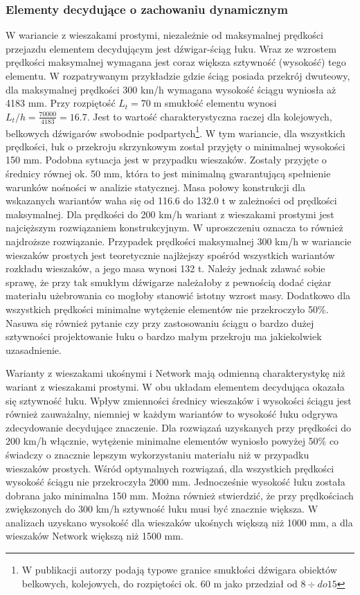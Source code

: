 \subsubsection{Elementy decydujące o zachowaniu dynamicznym}
W wariancie z wieszakami prostymi, niezależnie od maksymalnej prędkości przejazdu elementem decydującym jest dźwigar-ściąg łuku. Wraz ze wzrostem prędkości maksymalnej wymagana jest coraz większa sztywność (wysokość) tego elementu. W rozpatrywanym przykładzie gdzie ściąg posiada przekrój dwuteowy, dla maksymalnej prędkości 300 km/h wymagana wysokość ściągu wyniosła aż 4183 mm. Przy rozpiętość $L_t=70\;\mathrm{m}$ smukłość elementu wynosi $L_t/h=\frac{70 000}{4183}=16.7$. Jest to wartość charakterystyczna raczej dla kolejowych, belkowych dźwigarów swobodnie podpartych\footnote{
		W publikacji \cite{Madaj2009} autorzy podają typowe granice smukłości dźwigara obiektów belkowych, kolejowych, do rozpiętości ok. 60 m jako przedział od $8 \div do 15$}. 
W tym wariancie, dla wszystkich prędkości, łuk o przekroju skrzynkowym został przyjęty o minimalnej wysokości 150 mm. Podobna sytuacja jest w przypadku wieszaków. Zostały przyjęte o średnicy równej ok. 50 mm, która to jest minimalną gwarantującą spełnienie warunków nośności w analizie statycznej. Masa połowy konstrukcji dla wskazanych wariantów waha się od 116.6 do 132.0 t w zależności od prędkości maksymalnej. Dla prędkości do 200 km/h wariant z wieszakami prostymi jest najcięższym rozwiązaniem konstrukcyjnym. W uproszczeniu oznacza to również najdroższe rozwiązanie. Przypadek prędkości maksymalnej 300 km/h w wariancie wieszaków prostych jest teoretycznie najlżejszy spośród wszystkich wariantów rozkładu wieszaków, a jego masa wynosi 132 t. Należy jednak zdawać sobie sprawę, że przy tak smukłym dźwigarze należałoby z pewnością dodać ciężar materiału użebrowania co mogłoby stanowić istotny wzrost masy. Dodatkowo dla wszystkich prędkości minimalne wytężenie elementów nie przekroczyło 50\%. Nasuwa się również pytanie czy przy zastosowaniu ściągu o bardzo dużej sztywności projektowanie łuku o bardzo małym przekroju ma jakiekolwiek uzasadnienie. 


Warianty z wieszakami ukośnymi i Network mają odmienną charakterystykę niż wariant z wieszakami prostymi. W obu układam elementem decydująca okazała się sztywność łuku. Wpływ zmienności średnicy wieszaków i wysokości ściągu jest również zauważalny, niemniej w każdym wariantów to wysokość łuku odgrywa zdecydowanie decydujące znaczenie. Dla rozwiązań uzyskanych przy prędkości do 200 km/h włącznie, wytężenie minimalne elementów wyniosło powyżej 50\% co świadczy o znacznie lepszym wykorzystaniu materiału niż w przypadku wieszaków prostych. Wśród optymalnych rozwiązań, dla wszystkich prędkości wysokość ściągu nie przekroczyła 2000 mm. Jednocześnie wysokość łuku została dobrana jako minimalna 150 mm. Można również stwierdzić, że przy prędkościach zwiększonych do 300 km/h sztywność łuku musi być znacznie większa. W analizach uzyskano wysokość dla wieszaków ukośnych większą niż 1000 mm, a dla wieszaków Network większą niż 1500 mm.

